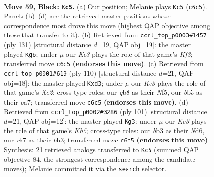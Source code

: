 \documentclass[11pt]{article}
\begin{document}
\clearpage

\begin{figure}[p]\centering
\begin{subfigure}{0.46\textwidth}\centering
\resizebox{\linewidth}{!}{%
\newchessgame
\chessboard[
  setfen={1Q6/1R6/2k5/8/8/1B2K3/8/8 b - - 2 59},
  showmover=false,
  pgfstyle=straightmove, color=movearrow, markmove={c6-c5}
]}
\caption{}
\end{subfigure}\hfill
\begin{subfigure}{0.46\textwidth}\centering
\resizebox{\linewidth}{!}{%
\newchessgame
\chessboard[
  setfen={8/8/5k2/4R3/4K3/8/8/8 b - - 7 66},
  showmover=false,
  pgfstyle=straightmove, color=movearrow, markmove={f6-g6}
]}
\caption{}
\end{subfigure}
\\[4pt]
\begin{subfigure}{0.46\textwidth}\centering
\resizebox{\linewidth}{!}{%
\newchessgame
\chessboard[
  setfen={3b2k1/p7/8/5N2/8/3r4/4K1P1/8 w - - 0 56},
  showmover=false,
  pgfstyle=straightmove, color=movearrow, markmove={e2-d3}
]}
\caption{}
\end{subfigure}\hfill
\begin{subfigure}{0.46\textwidth}\centering
\resizebox{\linewidth}{!}{%
\newchessgame
\chessboard[
  setfen={8/8/3n4/4b3/7k/3K3B/8/7R b - - 20 51},
  showmover=false,
  pgfstyle=straightmove, color=movearrow, markmove={h4-g3}
]}
\caption{}
\end{subfigure}
\caption{\textbf{Move 59, Black: \texttt{Kc5}.} (a) Our position; Melanie plays \texttt{Kc5} (\texttt{c6c5}). Panels (b)--(d) are the retrieved master positions whose correspondence most drove this move (highest QAP objective among those that transfer to it). (b) Retrieved from \texttt{ccrl\_top\_p0003\#1457} (ply 131) [structural distance $d$=19, QAP obj=19]: the master played \texttt{Kg6}; under $\mu$ our \emph{Kc3} plays the role of that game's \emph{Kf3}; transferred move \texttt{c6c5} \textbf{(endorses this move)}. (c) Retrieved from \texttt{ccrl\_top\_p0001\#619} (ply 110) [structural distance $d$=21, QAP obj=18]: the master played \texttt{Kxd3}; under $\mu$ our \emph{Kc3} plays the role of that game's \emph{Ke2}; cross-type roles: our \emph{q}b8 as their \emph{N}f5, our \emph{b}b3 as their \emph{p}a7; transferred move \texttt{c6c5} \textbf{(endorses this move)}. (d) Retrieved from \texttt{ccrl\_top\_p0002\#3286} (ply 101) [structural distance $d$=21, QAP obj=12]: the master played \texttt{Kg3}; under $\mu$ our \emph{Kc3} plays the role of that game's \emph{Kh5}; cross-type roles: our \emph{b}b3 as their \emph{N}d6, our \emph{r}b7 as their \emph{b}h3; transferred move \texttt{c6c5} \textbf{(endorses this move)}. Synthesis: 21 retrieved analogs transferred to \texttt{Kc5} (summed QAP objective 84, the strongest correspondence among the candidate moves); Melanie committed it via the \texttt{search} selector.}
\label{fig:thought-m117}
\end{figure}
\end{document}
